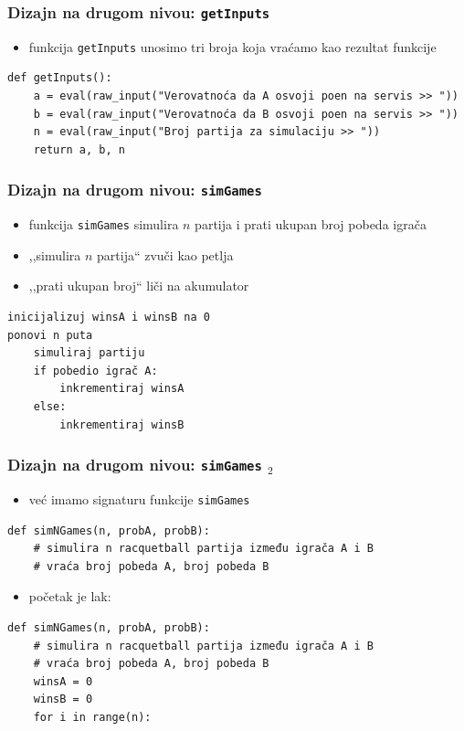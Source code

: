 \documentclass[utf8,compress]{beamer}
\begin{document}
\begin{frame}[fragile,shrink=15]
  \frametitle{Dizajn na drugom nivou: \texttt{getInputs}}
  \begin{itemize}
    \item funkcija \texttt{getInputs} unosimo tri broja koja vraćamo kao rezultat funkcije
  \end{itemize}
\begin{verbatim}
def getInputs():
    a = eval(raw_input("Verovatnoća da A osvoji poen na servis >> "))
    b = eval(raw_input("Verovatnoća da B osvoji poen na servis >> "))
    n = eval(raw_input("Broj partija za simulaciju >> "))
    return a, b, n
\end{verbatim}
\end{frame}

\begin{frame}[fragile]
  \frametitle{Dizajn na drugom nivou: \texttt{simGames}}
  \begin{itemize}
    \item funkcija \texttt{simGames} simulira $n$ partija i prati ukupan broj pobeda igrača
    \item ,,simulira $n$ partija`` zvuči kao petlja
    \item ,,prati ukupan broj`` liči na akumulator
  \end{itemize}
\begin{verbatim}
inicijalizuj winsA i winsB na 0
ponovi n puta
    simuliraj partiju
    if pobedio igrač A:
        inkrementiraj winsA
    else:
        inkrementiraj winsB
\end{verbatim}
\end{frame}

\begin{frame}[fragile]
  \frametitle{Dizajn na drugom nivou: \texttt{simGames} $_2$}
  \begin{itemize}
    \item već imamo signaturu funkcije \texttt{simGames}
  \end{itemize}
\begin{verbatim}
def simNGames(n, probA, probB):
    # simulira n racquetball partija između igrača A i B
    # vraća broj pobeda A, broj pobeda B
\end{verbatim}
  \begin{itemize}
    \item početak je lak:
  \end{itemize}
\begin{verbatim}
def simNGames(n, probA, probB):
    # simulira n racquetball partija između igrača A i B
    # vraća broj pobeda A, broj pobeda B
    winsA = 0
    winsB = 0
    for i in range(n):
\end{verbatim}
\end{frame}
\end{document}
